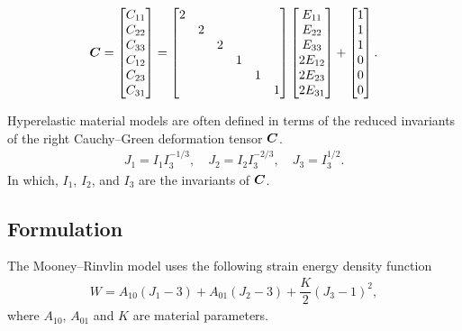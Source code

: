 \begin{gather}
    \bm{C}=\begin{bmatrix}
        C_{11} \\
        C_{22} \\
        C_{33} \\
        C_{12} \\
        C_{23} \\
        C_{31}
    \end{bmatrix}=\begin{bmatrix}
        2 &   &   &   &   &   \\
          & 2 &   &   &   &   \\
          &   & 2 &   &   &   \\
          &   &   & 1 &   &   \\
          &   &   &   & 1 &   \\
          &   &   &   &   & 1 \\
    \end{bmatrix}\begin{bmatrix}
        E_{11}  \\
        E_{22}  \\
        E_{33}  \\
        2E_{12} \\
        2E_{23} \\
        2E_{31}
    \end{bmatrix}+\begin{bmatrix}
        1 \\1\\1\\0\\0\\0
    \end{bmatrix}.
\end{gather}

Hyperelastic material models are often defined in terms of the reduced invariants of the right Cauchy--Green deformation tensor $\bm{C}$.
\begin{gather}
    J_1=I_1I_3^{-1/3},\quad
    J_2=I_2I_3^{-2/3},\quad
    J_3=I_3^{1/2}.
\end{gather}
In which, $I_1$, $I_2$, and $I_3$ are the invariants of $\bm{C}$.
\subsection{Formulation}
The Mooney--Rinvlin model uses the following strain energy density function
\begin{gather}
    W=A_{10}\left(J_1-3\right)+A_{01}\left(J_2-3\right)+\dfrac{K}{2}\left(J_3-1\right)^2,
\end{gather}
where $A_{10}$, $A_{01}$ and $K$ are material parameters.

